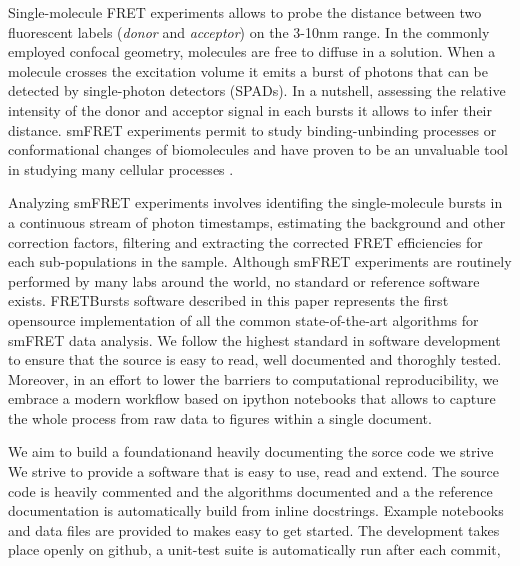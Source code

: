 
Single-molecule FRET experiments allows to probe the distance between two fluorescent labels (\textit{donor} and \textit{acceptor}) on the 3-10nm range. In the commonly employed confocal geometry, molecules are free to diffuse in a solution. When a molecule crosses the excitation volume it emits a burst of photons that can be detected by single-photon detectors (SPADs). In a nutshell, assessing the relative intensity of the donor and acceptor signal in each bursts it allows to infer their distance. smFRET experiments permit to study binding-unbinding processes or conformational changes of biomolecules and have proven to be an unvaluable tool in studying many cellular processes \cite{Kapanidis_2006}.

Analyzing smFRET experiments involves identifing the single-molecule bursts in a continuous stream of photon timestamps, estimating the background and other correction factors, filtering and extracting the corrected FRET efficiencies for each sub-populations in the sample. Although smFRET experiments are routinely performed by many labs around the world, no standard or reference software exists. FRETBursts software described in this paper represents the first opensource implementation of all the common state-of-the-art algorithms for smFRET data analysis. We follow the highest standard in software development to ensure that the source is easy to read, well documented and thoroghly tested. Moreover, in an effort to lower the barriers to computational reproducibility, we embrace a modern workflow based on ipython notebooks that allows to capture the whole process from raw data to figures within a single document.


We aim to build a foundationand heavily documenting the sorce code we strive We strive to provide a software that is easy to use, read and extend. The source code is heavily commented and the algorithms documented and a  the reference documentation is automatically build from inline docstrings. Example notebooks and data files are provided to makes easy to get started. The development takes place openly on github, a unit-test suite is automatically run after each commit,
